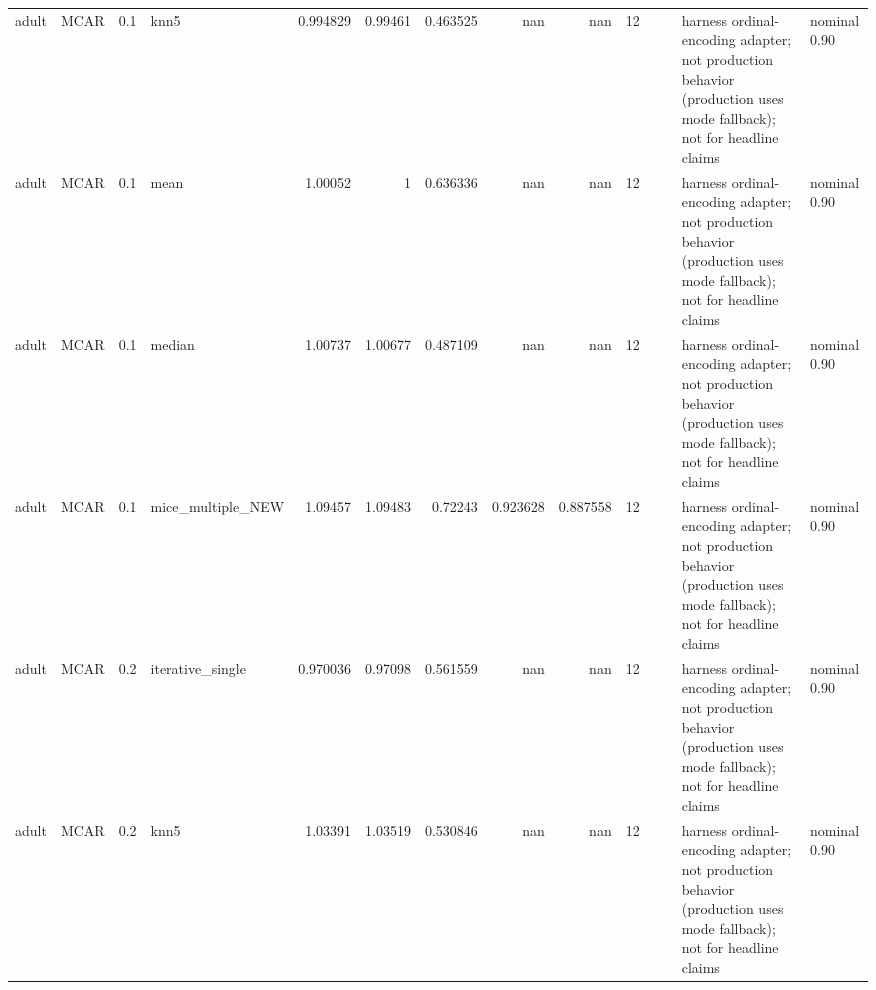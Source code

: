 \begin{table}[ht]
\begin{tabular}{llrlrrrrrrllll}
 adult                & MCAR        &         0.1 & knn5              &       0.994829 &             0.99461  &                 0.463525 &                     nan        &                       nan        &        12 &                    &                                         & harness ordinal-encoding adapter; not production behavior (production uses mode fallback); not for headline claims & nominal 0.90              \\
 adult                & MCAR        &         0.1 & mean              &       1.00052  &             1        &                 0.636336 &                     nan        &                       nan        &        12 &                    &                                         & harness ordinal-encoding adapter; not production behavior (production uses mode fallback); not for headline claims & nominal 0.90              \\
 adult                & MCAR        &         0.1 & median            &       1.00737  &             1.00677  &                 0.487109 &                     nan        &                       nan        &        12 &                    &                                         & harness ordinal-encoding adapter; not production behavior (production uses mode fallback); not for headline claims & nominal 0.90              \\
 adult                & MCAR        &         0.1 & mice\_multiple\_NEW &       1.09457  &             1.09483  &                 0.72243  &                       0.923628 &                         0.887558 &        12 &                    &                                         & harness ordinal-encoding adapter; not production behavior (production uses mode fallback); not for headline claims & nominal 0.90              \\
 adult                & MCAR        &         0.2 & iterative\_single  &       0.970036 &             0.97098  &                 0.561559 &                     nan        &                       nan        &        12 &                    &                                         & harness ordinal-encoding adapter; not production behavior (production uses mode fallback); not for headline claims & nominal 0.90              \\
 adult                & MCAR        &         0.2 & knn5              &       1.03391  &             1.03519  &                 0.530846 &                     nan        &                       nan        &        12 &                    &                                         & harness ordinal-encoding adapter; not production behavior (production uses mode fallback); not for headline claims & nominal 0.90              \\

\end{tabular}
\end{table}
